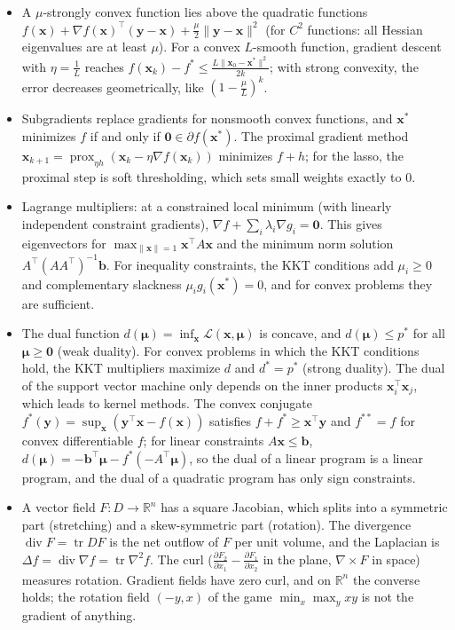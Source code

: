 \documentclass[11pt]{article}
\newcommand{\norm}[1]{\lVert #1 \rVert}
\theoremstyle{definition}
\theoremstyle{plain}
\theoremstyle{remark}
\DeclareMathOperator{\tr}{tr}
\DeclareMathOperator{\Div}{div}
\begin{document}
\begin{itemize}[leftmargin=*]
    \item A $\mu$-strongly convex function lies above the quadratic functions $f(\mathbf{x}) + \nabla f(\mathbf{x})^\top(\mathbf{y} - \mathbf{x}) + \frac{\mu}{2}\norm{\mathbf{y} - \mathbf{x}}^2$ (for $C^2$ functions: all Hessian eigenvalues are at least $\mu$). For a convex $L$-smooth function, gradient descent with $\eta = \frac{1}{L}$ reaches $f(\mathbf{x}_k) - f^* \leq \frac{L\norm{\mathbf{x}_0 - \mathbf{x}^*}^2}{2k}$; with strong convexity, the error decreases geometrically, like $(1 - \frac{\mu}{L})^k$.
    \item Subgradients replace gradients for nonsmooth convex functions, and $\mathbf{x}^*$ minimizes $f$ if and only if $\mathbf{0} \in \partial f(\mathbf{x}^*)$. The proximal gradient method $\mathbf{x}_{k+1} = \operatorname{prox}_{\eta h}(\mathbf{x}_k - \eta\nabla f(\mathbf{x}_k))$ minimizes $f + h$; for the lasso, the proximal step is soft thresholding, which sets small weights exactly to $0$.
    \item Lagrange multipliers: at a constrained local minimum (with linearly independent constraint gradients), $\nabla f + \sum_i \lambda_i\nabla g_i = \mathbf{0}$. This gives eigenvectors for $\max_{\norm{\mathbf{x}} = 1}\mathbf{x}^\top A\mathbf{x}$ and the minimum norm solution $A^\top(AA^\top)^{-1}\mathbf{b}$. For inequality constraints, the KKT conditions add $\mu_i \geq 0$ and complementary slackness $\mu_i g_i(\mathbf{x}^*) = 0$, and for convex problems they are sufficient.
    \item The dual function $d(\boldsymbol{\mu}) = \inf_{\mathbf{x}} \mathcal{L}(\mathbf{x}, \boldsymbol{\mu})$ is concave, and $d(\boldsymbol{\mu}) \leq p^*$ for all $\boldsymbol{\mu} \geq \mathbf{0}$ (weak duality). For convex problems in which the KKT conditions hold, the KKT multipliers maximize $d$ and $d^* = p^*$ (strong duality). The dual of the support vector machine only depends on the inner products $\mathbf{x}_i^\top\mathbf{x}_j$, which leads to kernel methods. The convex conjugate $f^*(\mathbf{y}) = \sup_{\mathbf{x}}(\mathbf{y}^\top\mathbf{x} - f(\mathbf{x}))$ satisfies $f + f^* \geq \mathbf{x}^\top\mathbf{y}$ and $f^{**} = f$ for convex differentiable $f$; for linear constraints $A\mathbf{x} \leq \mathbf{b}$, $d(\boldsymbol{\mu}) = -\mathbf{b}^\top\boldsymbol{\mu} - f^*(-A^\top\boldsymbol{\mu})$, so the dual of a linear program is a linear program, and the dual of a quadratic program has only sign constraints.
    \item A vector field $F: D \to \mathbb{R}^n$ has a square Jacobian, which splits into a symmetric part (stretching) and a skew-symmetric part (rotation). The divergence $\Div F = \tr DF$ is the net outflow of $F$ per unit volume, and the Laplacian is $\Delta f = \Div\nabla f = \tr\nabla^2 f$. The curl ($\frac{\partial F_2}{\partial x_1} - \frac{\partial F_1}{\partial x_2}$ in the plane, $\nabla \times F$ in space) measures rotation. Gradient fields have zero curl, and on $\mathbb{R}^n$ the converse holds; the rotation field $(-y, x)$ of the game $\min_x\max_y xy$ is not the gradient of anything.

\end{itemize}
\end{document}

